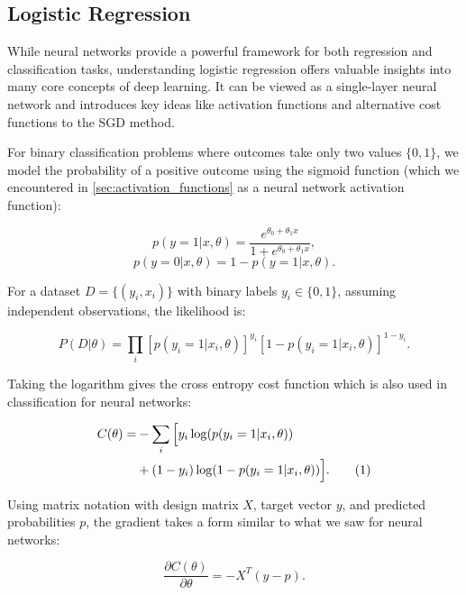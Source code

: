 \documentclass[aps,pra,english,notitlepage,reprint,nofootinbib]{revtex4-1}  %
\newcommand\numberthis{\addtocounter{equation}{1}\tag{\theequation}}
\begin{document}
\subsection{Logistic Regression}
While neural networks provide a powerful framework for both regression and classification tasks, understanding logistic regression offers valuable insights into many core concepts of deep learning. It can be viewed as a single-layer neural network and introduces key ideas like activation functions and alternative cost functions to the SGD method.

For binary classification problems where outcomes take only two values \( \{0,1\} \), we model the probability of a positive outcome using the sigmoid function (which we encountered in \cref{sec:activation_functions} as a neural network activation function):

\begin{equation}
    p(y=1|x, \theta) = \frac{e^{\theta_0 + \theta_1x}}{1 + e^{\theta_0 + \theta_1x}},
\end{equation}
\begin{equation}
    p(y=0|x, \theta) = 1 - p(y=1|x, \theta).
\end{equation}

For a dataset \( D = \{(y_i,x_i)\} \) with binary labels \( y_i \in \{0,1\} \), assuming independent observations, the likelihood is:

\begin{equation}
    P(D|\theta) = \prod_i[p(y_i=1|x_i,\theta)]^{y_i}[1-p(y_i=1|x_i,\theta)]^{1-y_i}.
\end{equation}

Taking the logarithm gives the cross entropy cost function which is also used in classification for neural networks:

\begin{align*}
    C(\theta)
    = &-\sum_i\Big[y_i\log(p(y_i=1|x_i,\theta)) \\
    & + (1-y_i)\log(1-p(y_i=1|x_i,\theta))\Big]. \numberthis \label{logistic_cost}
\end{align*}

Using matrix notation with design matrix \( X \), target vector \( y \), and predicted probabilities \( p \), the gradient takes a form similar to what we saw for neural networks:

\begin{equation}
    \frac{\partial C(\theta)}{\partial \theta} = -X^T(y-p).
\end{equation}
\end{document}
